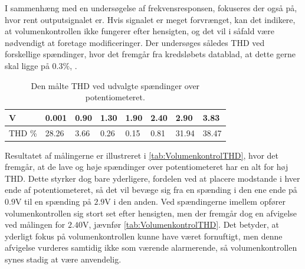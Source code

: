 \noindent
%
I sammenhæng med en undersøgelse af frekvensresponsen, fokuseres der også på, hvor rent outputsignalet er. Hvis signalet er meget forvrænget, kan det indikere, at volumenkontrollen ikke fungerer efter hensigten, og det vil i såfald være nødvendigt at foretage modificeringer. Der undersøges således THD ved forskellige spændinger, hvor det fremgår fra kredsløbets datablad, at dette gerne skal ligge på $0.3\%$, \parencite[][2]{PDF:VolumeControl}.
%
\begin{table}[H]
\centering
\begin{tabular}{|l|l|l|l|l|l|l|l|}
\hline
V & 0.001 & 0.90 & 1.30 & 1.90 & 2.40 & 2.90 & 3.83 \\ \hline
THD \% & 28.26 & 3.66 & 0.26 & 0.15 & 0.81 & 31.94 & 38.47 \\ \hline
\end{tabular}
\caption{Den målte THD ved udvalgte spændinger over potentiometeret.}
\label{tab:VolumenkontrolTHD}
\end{table}
%
Resultatet af målingerne er illustreret i \autoref{tab:VolumenkontrolTHD}, hvor det fremgår, at de lave og høje spændinger over potentiometeret har en alt for høj THD. Dette styrker dog bare yderligere, fordelen ved at placere modstande i hver ende af potentiometeret, så det vil bevæge sig fra en spænding i den ene ende på $0.9$V til en spænding på $2.9$V i den anden. Ved spændingerne imellem opfører volumenkontrollen sig stort set efter hensigten, men der fremgår dog en afvigelse ved målingen for $2.40$V, jævnfør \autoref{tab:VolumenkontrolTHD}. Det betyder, at yderligt fokus på volumenkontrollen kunne have været fornuftigt, men denne afvigelse vurderes samtidig ikke som værende alarmerende, så volumenkontrollen synes stadig at være anvendelig.
%

